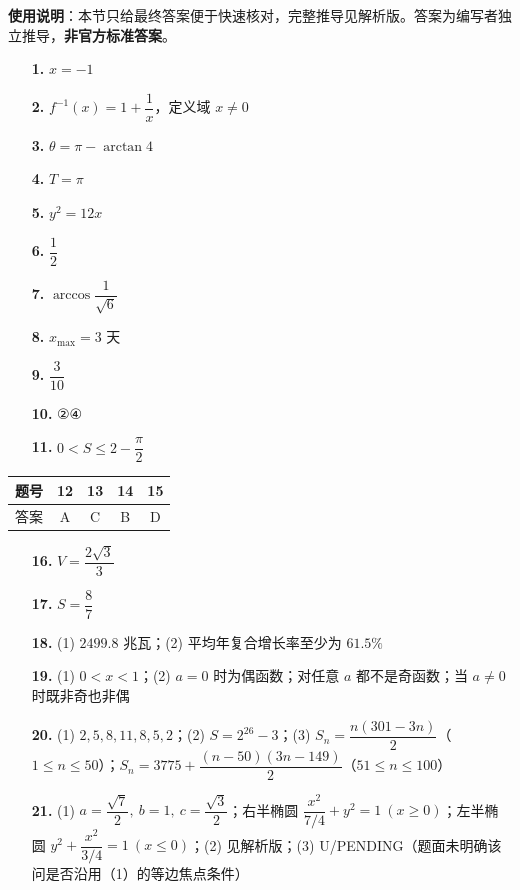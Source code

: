 
\begin{gknotice}
\textbf{使用说明}：本节只给最终答案便于快速核对，完整推导见解析版。答案为编写者独立推导，\textbf{非官方标准答案}。
\end{gknotice}

\begin{itemize}[leftmargin=2.6em]
  \item[\textbf{1.}] $x=-1$
  \item[\textbf{2.}] $f^{-1}(x)=1+\dfrac1x$，定义域 $x\ne0$
  \item[\textbf{3.}] $\theta=\pi-\arctan4$
  \item[\textbf{4.}] $T=\pi$
  \item[\textbf{5.}] $y^2=12x$
  \item[\textbf{6.}] $\dfrac12$
  \item[\textbf{7.}] $\arccos\dfrac1{\sqrt6}$
  \item[\textbf{8.}] $x_{\max}=3$ 天
  \item[\textbf{9.}] $\dfrac3{10}$
  \item[\textbf{10.}] ②④
  \item[\textbf{11.}] $0<S\le 2-\dfrac\pi2$
\end{itemize}

\begin{center}\begin{tabular}{ccccc}
\toprule
题号 & 12 & 13 & 14 & 15 \\
\midrule
答案 & A & C & B & D \\
\bottomrule
\end{tabular}\end{center}

\begin{itemize}[leftmargin=2.6em]
  \item[\textbf{16.}] $V=\dfrac{2\sqrt3}{3}$
  \item[\textbf{17.}] $S=\dfrac87$
  \item[\textbf{18.}] (1) $2499.8$ 兆瓦；(2) 平均年复合增长率至少为 $61.5\%$
  \item[\textbf{19.}] (1) $0<x<1$；(2) $a=0$ 时为偶函数；对任意 $a$ 都不是奇函数；当 $a\ne0$ 时既非奇也非偶
  \item[\textbf{20.}] (1) $2,5,8,11,8,5,2$；(2) $S=2^{26}-3$；(3) $S_n=\dfrac{n(301-3n)}2$（$1\le n\le50$）；$S_n=3775+\dfrac{(n-50)(3n-149)}2$（$51\le n\le100$）
  \item[\textbf{21.}] (1) $a=\dfrac{\sqrt7}{2},\ b=1,\ c=\dfrac{\sqrt3}{2}$；右半椭圆 $\dfrac{x^2}{7/4}+y^2=1\ (x\ge0)$；左半椭圆 $y^2+\dfrac{x^2}{3/4}=1\ (x\le0)$；(2) 见解析版；(3) U/PENDING（题面未明确该问是否沿用（1）的等边焦点条件）
\end{itemize}
